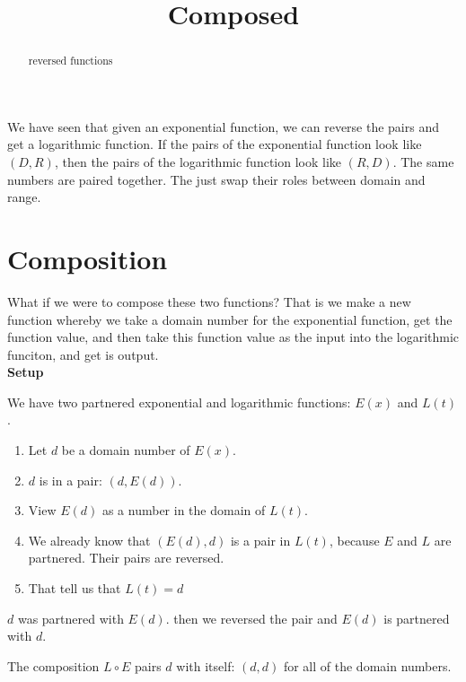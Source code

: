 \documentclass{ximera}
\title{Composed}
\begin{document}
\begin{abstract}
reversed functions
\end{abstract}
\maketitle







We have seen that given an exponential function, we can reverse the pairs and get a logarithmic function.  If the pairs of the exponential function look like $(D,R)$, then the pairs of the logarithmic function look like $(R,D)$.  The same numbers are paired together.  The just swap their roles between domain and range.

\section{Composition}

What if we were to compose these two functions?  That is we make a new function whereby we take a domain number for the exponential function, get the function value, and then take this function value as the input into the logarithmic funciton, and get is output. \\





\textbf{Setup}

We have two partnered exponential and logarithmic functions: $E(x)$ and $L(t)$.  \\

\begin{enumerate}
\item Let $d$ be a domain number of $E(x)$.
\item $d$ is in a pair: $(d, E(d))$.
\item View $E(d)$ as a number in the domain of $L(t)$.
\item We already know that $(E(d),d)$ is a pair in $L(t)$, because $E$ and $L$ are partnered.  Their pairs are reversed.
\item That tell us that $L(t)=d$
\end{enumerate}



$d$ was partnered with $E(d)$.  then we reversed the pair and $E(d)$ is partnered with $d$.

The composition $L \circ E$ pairs $d$ with itself: $(d,d)$ for all of the domain numbers. \\
\end{document}
